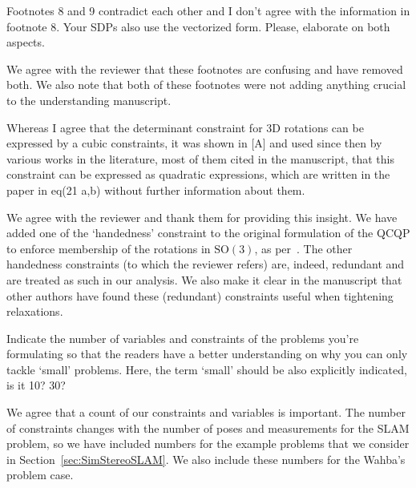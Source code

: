 Footnotes 8 and 9 contradict each other and I don’t agree with the information in footnote 8. Your SDPs also use the vectorized form. Please, elaborate on both aspects.
\begin{response}
    We agree with the reviewer that these footnotes are confusing and have removed both. We also note that both of these footnotes were not adding anything crucial to the understanding manuscript.
\end{response}

Whereas I agree that the determinant constraint for 3D rotations can be expressed by a cubic constraints, it was shown in [A] and used since then by various works in the literature, most of them cited in the manuscript, that this constraint can be expressed as quadratic expressions, which are written in the paper in eq(21 a,b) without further information about them. 
\begin{response}
    We agree with the reviewer and thank them for providing this insight. We have added one of the `handedness' constraint to the original formulation of the QCQP to enforce membership of the rotations in $\mbox{SO}(3)$, as per~\cite{tronInclusionDeterminantConstraints}. The other handedness constraints (to which the reviewer refers) are, indeed, redundant and are treated as such in our analysis. We also make it clear in the manuscript that other authors have found these (redundant) constraints useful when tightening relaxations. 
\end{response}

Indicate the number of variables and constraints of the problems you're formulating so that the readers have a better understanding on why you can only tackle `small' problems. Here, the term `small' should be also explicitly indicated, is it 10? 30? 
\begin{response}
We agree that a count of our constraints and variables is important. The number of constraints changes with the number of poses and measurements for the SLAM problem, so we have included numbers for the example problems that we consider in Section~\ref{sec:SimStereoSLAM}. We also include these numbers for the Wahba's problem case.
\end{response}

